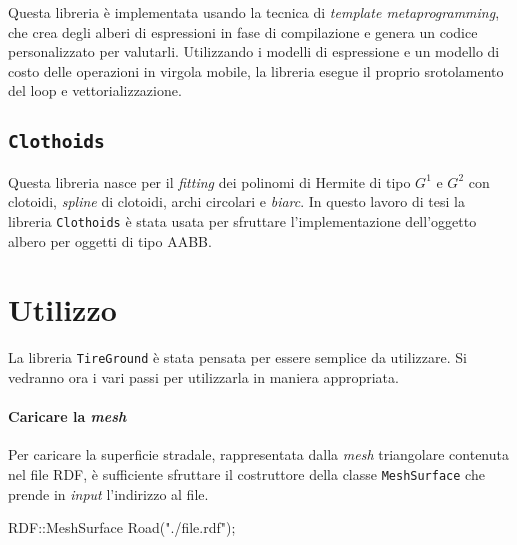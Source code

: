 Questa libreria è implementata usando la tecnica di \textit{template metaprogramming}, che crea degli alberi di espressioni in fase di compilazione e genera un codice personalizzato per valutarli. Utilizzando i modelli di espressione e un modello di costo delle operazioni in virgola mobile, la libreria esegue il proprio srotolamento del loop e vettorializzazione.
%
\subsection{\texttt{Clothoids}}
Questa libreria nasce per il \textit{fitting} dei polinomi di Hermite di tipo $G^1$ e $G^2$ con clotoidi, \textit{spline} di clotoidi, archi circolari e \textit{biarc}. In questo lavoro di tesi la libreria \texttt{Clothoids} è stata usata per sfruttare l'implementazione dell'oggetto albero per oggetti di tipo \ac{AABB}.
%
\section{Utilizzo}
La libreria \texttt{TireGround} è stata pensata per essere semplice da utilizzare. Si vedranno ora i vari passi per utilizzarla in maniera appropriata.
%
\paragraph{Caricare la \textit{mesh}}
Per caricare la superficie stradale, rappresentata dalla \textit{mesh} triangolare contenuta nel file \ac{RDF}, è sufficiente sfruttare il costruttore della classe \texttt{MeshSurface} che prende in \textit{input} l'indirizzo al file.
\begin{pseudoc}
	RDF::MeshSurface Road("./file.rdf");
\end{pseudoc}
%
